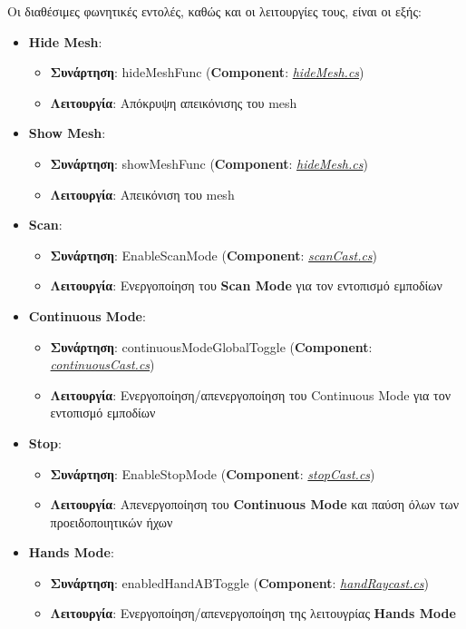 Οι διαθέσιμες φωνητικές εντολές, καθώς και οι λειτουργίες τους, είναι οι εξής:
\begin{itemize}
    \item \textbf{Hide Mesh}:
    \begin{itemize}
        \item \textbf{Συνάρτηση}: hideMeshFunc (\textbf{Component}: \hyperref[lst:hideMesh]{\textit{hideMesh.cs}})
        \item \textbf{Λειτουργία}: Απόκρυψη απεικόνισης του mesh
    \end{itemize}
    \item \textbf{Show Mesh}:
    \begin{itemize}
        \item \textbf{Συνάρτηση}: showMeshFunc (\textbf{Component}: \hyperref[lst:hideMesh]{\textit{hideMesh.cs}})
        \item \textbf{Λειτουργία}: Απεικόνιση του mesh
    \end{itemize}
    \item \textbf{Scan}:
    \begin{itemize}
        \item \textbf{Συνάρτηση}: EnableScanMode (\textbf{Component}: \hyperref[lst:scanCast]{\textit{scanCast.cs}})
        \item \textbf{Λειτουργία}: Ενεργοποίηση του \textbf{Scan Mode} για τον εντοπισμό εμποδίων
    \end{itemize}
    \item \textbf{Continuous Mode}:
    \begin{itemize}
        \item \textbf{Συνάρτηση}: continuousModeGlobalToggle (\textbf{Component}: \hyperref[lst:continuousCast]{\textit{continuousCast.cs}})
        \item \textbf{Λειτουργία}: Ενεργοποίηση/απενεργοποίηση του Continuous Mode για τον εντοπισμό εμποδίων
    \end{itemize}
    \item \textbf{Stop}:
    \begin{itemize}
        \item \textbf{Συνάρτηση}: EnableStopMode (\textbf{Component}: \hyperref[lst:stopCast]{\textit{stopCast.cs}})
        \item \textbf{Λειτουργία}: Απενεργοποίηση του \textbf{Continuous Mode} και παύση όλων των προειδοποιητικών ήχων
    \end{itemize}
    \item \textbf{Hands Mode}: 
    \begin{itemize}
        \item \textbf{Συνάρτηση}: enabledHandABToggle (\textbf{Component}: \hyperref[lst:handRaycast]{\textit{handRaycast.cs}})
        \item \textbf{Λειτουργία}: Ενεργοποίηση/απενεργοποίηση της λειτουγρίας \textbf{Hands Mode}
    \end{itemize}
\end{itemize}